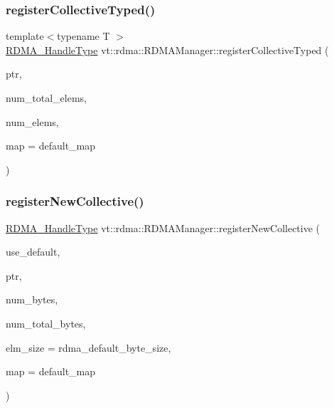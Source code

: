 \subsubsection{\texorpdfstring{register\+Collective\+Typed()}{registerCollectiveTyped()}}
{\footnotesize\ttfamily template$<$typename T $>$ \\
\hyperlink{namespacevt_a10442579ec4e7ebef223818e64bcf908}{R\+D\+M\+A\+\_\+\+Handle\+Type} vt\+::rdma\+::\+R\+D\+M\+A\+Manager\+::register\+Collective\+Typed (\begin{DoxyParamCaption}\item[{T}]{ptr,  }\item[{\hyperlink{namespacevt_aab8d55968084610ce3b17057981e9300}{Byte\+Type} const \&}]{num\+\_\+total\+\_\+elems,  }\item[{\hyperlink{namespacevt_aab8d55968084610ce3b17057981e9300}{Byte\+Type} const \&}]{num\+\_\+elems,  }\item[{\hyperlink{structvt_1_1rdma_1_1_r_d_m_a_manager_a16e12d11cf7d771df0d3dc6947a4f95c}{R\+D\+M\+A\+\_\+\+Map\+Type} const \&}]{map = {\ttfamily default\+\_\+map} }\end{DoxyParamCaption})\hspace{0.3cm}{\ttfamily [inline]}}

\mbox{\label{structvt_1_1rdma_1_1_r_d_m_a_manager_a339763a690f218c3df58268a691ecfe4}} 
\subsubsection{\texorpdfstring{register\+New\+Collective()}{registerNewCollective()}}
{\footnotesize\ttfamily \hyperlink{namespacevt_a10442579ec4e7ebef223818e64bcf908}{R\+D\+M\+A\+\_\+\+Handle\+Type} vt\+::rdma\+::\+R\+D\+M\+A\+Manager\+::register\+New\+Collective (\begin{DoxyParamCaption}\item[{bool const \&}]{use\+\_\+default,  }\item[{\hyperlink{namespacevt_a9e2c953286c7616f7c218e9951790776}{R\+D\+M\+A\+\_\+\+Ptr\+Type} const \&}]{ptr,  }\item[{\hyperlink{namespacevt_aab8d55968084610ce3b17057981e9300}{Byte\+Type} const \&}]{num\+\_\+bytes,  }\item[{\hyperlink{namespacevt_aab8d55968084610ce3b17057981e9300}{Byte\+Type} const \&}]{num\+\_\+total\+\_\+bytes,  }\item[{\hyperlink{namespacevt_aab8d55968084610ce3b17057981e9300}{Byte\+Type} const \&}]{elm\+\_\+size = {\ttfamily rdma\+\_\+default\+\_\+byte\+\_\+size},  }\item[{\hyperlink{structvt_1_1rdma_1_1_r_d_m_a_manager_a16e12d11cf7d771df0d3dc6947a4f95c}{R\+D\+M\+A\+\_\+\+Map\+Type} const \&}]{map = {\ttfamily default\+\_\+map} }\end{DoxyParamCaption})}

